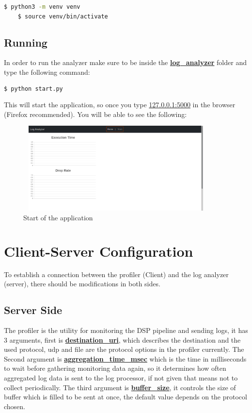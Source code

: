 \begin{lstlisting}[language=bash, caption={Create virtual environment},captionpos=b]
	$ python3 -m venv venv	
	$ source venv/bin/activate
\end{lstlisting}


\subsection{Running} %
In order to run the analyzer make sure to be inside the
\textbf{\url{log_analyzer}} folder and type the following
command:

\begin{lstlisting}[language=bash, caption={Start application},captionpos=b]
	$ python start.py
\end{lstlisting}

This will start the application, so once you type \url{127.0.0.1:5000}
in the browser (Firefox recommended). You will be able to see the following:

\begin{figure}[H]
	\centering
	\includegraphics[width=0.9\textwidth,height=175px]{images/start.png}
	\caption{Start of the application}
	\label{fig:empty_page}
\end{figure}

\section{Client-Server Configuration} %
To establish a connection between the profiler (Client)
and the log analyzer (server), there should be modifications in both
sides.

\subsection{Server Side}

The profiler is the utility for monitoring the DSP pipeline and sending logs,
it has 3 arguments, first is \textbf{\url{destination_uri}},
which describes the destination and the used protocol, udp and file
are the protocol options in the profiler currently. The Second argument
is \textbf{\url{aggregation_time_msec}} which is the time in milliseconds to wait 
before gathering monitoring data again, so it determines how often aggregated
log data is sent to the log processor, if not given that means not to collect
periodically. The third argument is \textbf{\url{buffer_size}}, it controls the size
of buffer which is filled to be sent at once, the default value depends on the
protocol chosen.

